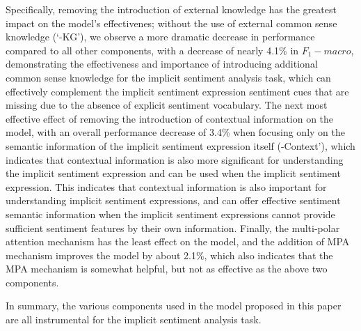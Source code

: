 Specifically, removing the introduction of external knowledge has the greatest impact on the model's effectivenes; without the use of external common sense knowledge (`-KG'), we observe a more dramatic decrease in performance compared to all other components, with a decrease of nearly 4.1\% in $F_1-macro$, demonstrating the effectiveness and importance of introducing additional common sense knowledge for the implicit sentiment analysis task, which can effectively complement the implicit sentiment expression sentiment cues that are missing due to the absence of explicit sentiment vocabulary.
The next most effective effect of removing the introduction of contextual information on the model, with an overall performance decrease of 3.4\% when focusing only on the semantic information of the implicit sentiment expression itself (-Context'), which indicates that contextual information is also more significant for understanding the implicit sentiment expression and can be used when the implicit sentiment expression. This indicates that contextual information is also important for understanding implicit sentiment expressions, and can offer effective sentiment semantic information when the implicit sentiment expressions cannot provide sufficient sentiment features by their own information.
Finally, the multi-polar attention mechanism has the least effect on the model, and the addition of MPA mechanism improves the model by about 2.1\%, which also indicates that the  MPA mechanism is somewhat helpful, but not as effective as the above two components.

In summary, the various components used in the model proposed in this paper are all instrumental for the implicit sentiment analysis task.
